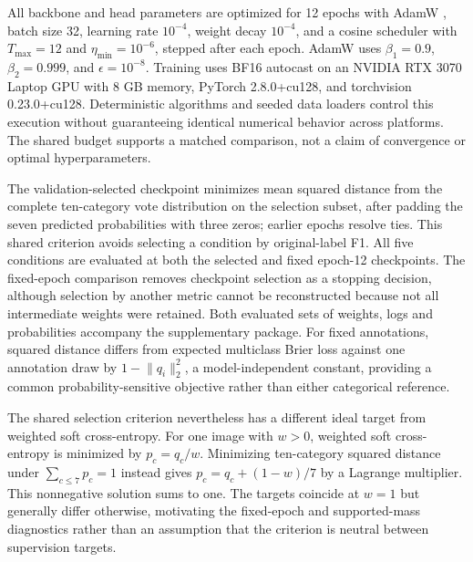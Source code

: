 \documentclass[pdflatex,sn-mathphys-num]{sn-jnl}
\begin{document}
All backbone and head parameters are optimized for 12 epochs with AdamW \cite{loshchilov2019adamw}, batch size 32, learning rate $10^{-4}$, weight decay $10^{-4}$, and a cosine scheduler with $T_{\max}=12$ and $\eta_{\min}=10^{-6}$, stepped after each epoch. AdamW uses $\beta_1=0.9$, $\beta_2=0.999$, and $\epsilon=10^{-8}$. Training uses BF16 autocast on an NVIDIA RTX 3070 Laptop GPU with 8 GB memory, PyTorch 2.8.0+cu128, and torchvision 0.23.0+cu128. Deterministic algorithms and seeded data loaders control this execution without guaranteeing identical numerical behavior across platforms. The shared budget supports a matched comparison, not a claim of convergence or optimal hyperparameters.

\begin{samepage}
The validation-selected checkpoint minimizes mean squared distance from the complete ten-category vote distribution on the selection subset, after padding the seven predicted probabilities with three zeros; earlier epochs resolve ties. This shared criterion avoids selecting a condition by original-label F1. All five conditions are evaluated at both the selected and fixed epoch-12 checkpoints. The fixed-epoch comparison removes checkpoint selection as a stopping decision, although selection by another metric cannot be reconstructed because not all intermediate weights were retained. Both evaluated sets of weights, logs and probabilities accompany the supplementary package. For fixed annotations, squared distance differs from expected multiclass Brier loss against one annotation draw by $1-\lVert q_i\rVert_2^2$, a model-independent constant, providing a common probability-sensitive objective rather than either categorical reference.

The shared selection criterion nevertheless has a different ideal target from weighted soft cross-entropy. For one image with $w>0$, weighted soft cross-entropy is minimized by $p_c=q_c/w$. Minimizing ten-category squared distance under $\sum_{c\leq7}p_c=1$ instead gives $p_c=q_c+(1-w)/7$ by a Lagrange multiplier. This nonnegative solution sums to one. The targets coincide at $w=1$ but generally differ otherwise, motivating the fixed-epoch and supported-mass diagnostics rather than an assumption that the criterion is neutral between supervision targets.
\end{samepage}
\end{document}
